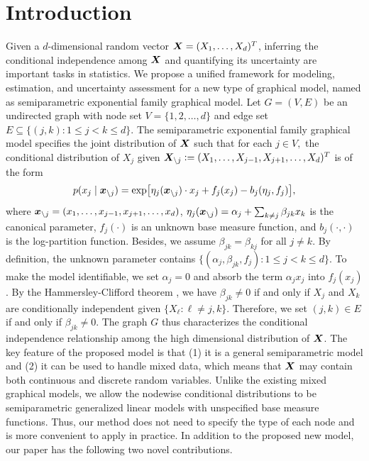 \documentclass[twoside,11pt]{article}
\newcommand{\defeq}{\vcentcolon=}
\begin{document}
 
 
 


\section{Introduction}
 

Given a $d$-dimensional random vector $\bm{X} = (X_1,\ldots,X_d)^T$, inferring the conditional independence among $\bm{X}$ and quantifying its uncertainty are important tasks in statistics. We propose a unified framework for modeling, estimation, and uncertainty assessment for a new type of graphical model, named as semiparametric exponential family graphical model. Let $G  = (V,E)$ be an undirected graph with node set $V = \{1,2,\ldots,d\}$ and edge set $E \subseteq \{(j,k)\colon  1 \leq  j  <   k \leq  d\}$. 
The semiparametric exponential family graphical model specifies the joint distribution of $\bm{X} $ such that  for each $j \in V,$ 
the conditional distribution  of $X_j$ given $\bX_{\setminus {j}}\defeq (X_1,\ldots, X_{j-1}, X_{j+1},\ldots, X_{d})^T $ is of the form 
\begin{eqnarray}\label{eq::spexf}
p (x_j\mid \bm{x}_{\setminus j}) = \exp\bigl[\eta_j(\bm{x}_{\setminus j})\cdot x_j + f_j(x_j) - b_j(\eta_j, f_j)\bigr],
\end{eqnarray}
where $\bm{x}_{\setminus j} = (x_1,\ldots, x_{j-1},x_{j+1},\ldots, x_d)$, $\eta_j(\bm{x}_{\setminus j}) = \alpha_j + \sum_{k \neq j} \beta_{jk} x_k$ is the canonical parameter, $f_j(\cdot)$ is an unknown base measure function,  and $b_j(\cdot,\cdot)$ is the log-partition function.
Besides, we assume   $\beta_{jk} = \beta_{ kj}$ for all $j \neq k$. 
 By definition, the unknown parameter contains $\{ (\alpha_j, \beta_{jk}, f_j ) \colon 1 \leq j <  k\leq d\}$. 
To make the model identifiable, we set $\alpha_j=0$ and absorb the term $\alpha_jx_j$ into $f_j(x_j)$. By the Hammersley-Clifford theorem \citep{besag1974spatial}, 
 we have  $\beta_{jk} \neq 0$ if and only if $X_j$ and $X_k$ are conditionally independent given $\{ X_{\ell}\colon \ell\neq j,k\}$.   Therefore, we set $(j,k) \in E$ if and only if $\beta_{jk}\neq 0$.  The graph $G$ thus characterizes the conditional independence relationship among the high dimensional distribution of $\bm{X}$. The key feature of the proposed model is that (1) it is a general semiparametric model and (2) it can be used to handle mixed data, which means that $\bm{X}$ may contain both continuous and discrete random variables. 
Unlike the existing mixed graphical models, we allow the nodewise conditional distributions to be semiparametric generalized linear models with unspecified base measure functions. Thus, our method does not need to specify the type of each node and is more convenient to apply in practice. In addition to the proposed new model, our paper has the following two novel contributions. 
 
\end{document}

